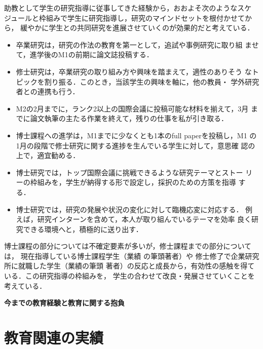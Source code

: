 \documentclass[dvipdfmx]{jsarticle}
\begin{document}
助教として学生の研究指導に従事してきた経験から，おおよそ次のようなスケ
ジュールと枠組みで学生に研究指導し，研究のマインドセットを根付かせてから，
緩やかに学生との共同研究を進展させていくのが効果的だと考えている．
\begin{itemize}
 \item 卒業研究は，研究の作法の教育を第一として，追試や事例研究に取り組
       ませて，進学後のM1の前期に論文誌投稿する．

 \item 修士研究は，卒業研究の取り組み方や興味を踏まえて，適性のありそう
       なトピックを割り振る．このとき，当該学生の興味を軸に，他の教員・
       学外研究者との連携も行う．

 \item M2の2月までに，ランク2以上の国際会議に投稿可能な材料を揃えて，3月
       までに論文執筆の主たる作業を終えて，残りの仕事を私が引き取る．

 \item 博士課程への進学は，M1までに少なくとも1本のfull paperを投稿し，M1
       の1月の段階で修士研究に関する進捗を生んでいる学生に対して，意思確
       認の上で，適宜勧める．

 \item 博士研究では，トップ国際会議に挑戦できるような研究テーマとストー
       リーの枠組みを，学生が納得する形で設定し，採択のための方策を指導
       する．

 \item 博士研究では，研究の発展や状況の変化に対して臨機応変に対応する．
       例えば，研究インターンを含めて，本人が取り組んでいるテーマを効率
       良く研究できる環境へと，積極的に送り出す．
\end{itemize}
博士課程の部分については不確定要素が多いが，修士課程までの部分については，
現在指導している博士課程学生（業績
\cite{pro22o:far_memory,jip22:argodsm,ppl23c3:far_memory}の筆頭著者）や
修士修了で企業研究所に就職した学生（業績\cite{ppl22:sfa,ppl23c3:otf_sfa}の筆頭
著者）の反応と成長から，有効性の感触を得ている．この研究指導の枠組みを，
学生の合わせて改良・発展させていくことを考えている．


\newpage
\begin{center}
\LARGE\bfseries 今までの教育経験と教育に関する抱負
\end{center}
\bigskip

\section*{教育関連の実績}
\end{document}
